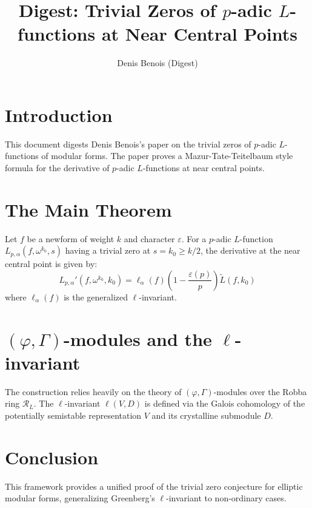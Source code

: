 \documentclass{article}
\begin{document}
\title{Digest: Trivial Zeros of $p$-adic $L$-functions at Near Central Points}
\author{Denis Benois (Digest)}
\maketitle

\section{Introduction}
This document digests Denis Benois's paper on the trivial zeros of $p$-adic $L$-functions of modular forms. The paper proves a Mazur-Tate-Teitelbaum style formula for the derivative of $p$-adic $L$-functions at near central points.

\section{The Main Theorem}
Let $f$ be a newform of weight $k$ and character $\varepsilon$. For a $p$-adic $L$-function $L_{p, \alpha}(f, \omega^{k_0}, s)$ having a trivial zero at $s=k_0 \ge k/2$, the derivative at the near central point is given by:
\begin{equation}
L_{p, \alpha}'(f, \omega^{k_0}, k_0) = \ell_{\alpha}(f) \left(1 - \frac{\varepsilon(p)}{p}\right) \tilde{L}(f, k_0)
\end{equation}
where $\ell_{\alpha}(f)$ is the generalized $\ell$-invariant.

\section{$(\varphi, \Gamma)$-modules and the $\ell$-invariant}
The construction relies heavily on the theory of $(\varphi, \Gamma)$-modules over the Robba ring $\mathcal{R}_L$. The $\ell$-invariant $\ell(V, D)$ is defined via the Galois cohomology of the potentially semistable representation $V$ and its crystalline submodule $D$. 

\section{Conclusion}
This framework provides a unified proof of the trivial zero conjecture for elliptic modular forms, generalizing Greenberg's $\ell$-invariant to non-ordinary cases.
\end{document}
